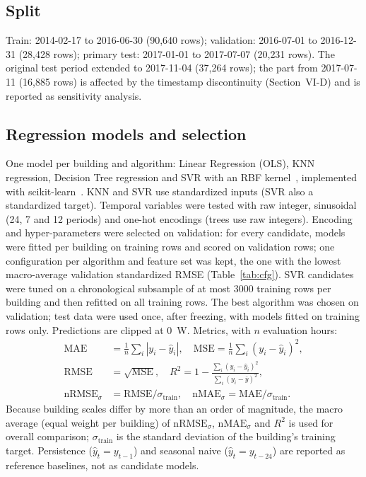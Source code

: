 \documentclass[conference]{IEEEtran}
\begin{document}
\subsection{Split}
Train: 2014-02-17 to 2016-06-30 (90{,}640 rows); validation: 2016-07-01 to 2016-12-31 (28{,}428 rows); primary test: 2017-01-01 to 2017-07-07 (20{,}231 rows). The original test period extended to 2017-11-04
(37{,}264 rows); the part from 2017-07-11 (16{,}885 rows) is affected by the timestamp discontinuity (Section~VI-D) and is reported as sensitivity analysis.

\subsection{Regression models and selection}
One model per building and algorithm: Linear Regression (OLS), KNN regression, Decision Tree regression and SVR with an RBF kernel~\cite{drucker1997svr}, implemented with scikit-learn~\cite{pedregosa2011sklearn}.
KNN and SVR use standardized inputs (SVR also a standardized target). Temporal variables were tested with raw integer, sinusoidal (24, 7 and 12 periods) and one-hot encodings
(trees use raw integers). Encoding and hyper-parameters were selected on validation: for every candidate, models were fitted per building on training rows and scored on validation rows;
one configuration per algorithm and feature set was kept, the one with the lowest macro-average validation standardized RMSE (Table~\ref{tab:cfg}). SVR candidates were tuned on a chronological subsample of at most 3000 training rows per building and then refitted on all training rows.
The best algorithm was chosen on validation; test data were used once, after freezing, with models fitted on training rows only. Predictions are clipped at 0~W.
Metrics, with $n$ evaluation hours:
\begin{align}
\mathrm{MAE} &= \tfrac1n\textstyle\sum_i |y_i-\hat y_i|, \quad \mathrm{MSE} = \tfrac1n\sum_i (y_i-\hat y_i)^2,\\
\mathrm{RMSE} &= \sqrt{\mathrm{MSE}}, \quad R^2 = 1-\tfrac{\sum_i (y_i-\hat y_i)^2}{\sum_i (y_i-\bar y)^2},\\
\mathrm{nRMSE}_\sigma &= \mathrm{RMSE}/\sigma_{\mathrm{train}}, \quad \mathrm{nMAE}_\sigma = \mathrm{MAE}/\sigma_{\mathrm{train}} .
\end{align}
Because building scales differ by more than an order of magnitude, the macro average (equal weight per building) of $\mathrm{nRMSE}_\sigma$, $\mathrm{nMAE}_\sigma$ and $R^2$ is used for overall comparison; $\sigma_{\mathrm{train}}$ is the standard deviation of the building's training target.
Persistence ($\hat y_t=y_{t-1}$) and seasonal naive ($\hat y_t=y_{t-24}$) are reported as reference baselines, not as candidate models.
\end{document}
